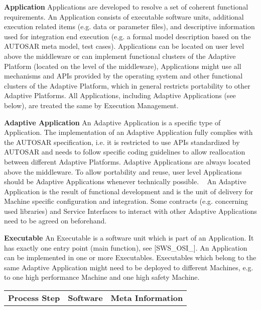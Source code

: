 \begin{DoxyItemize}
\item {\bfseries Application} Applications are developed to resolve a set of coherent functional requirements. An Application consists of executable software units, additional execution related items (e.\+g. data or parameter files), and descriptive information used for integration end execution (e.\+g. a formal model description based on the A\+U\+T\+O\+S\+AR meta model, test cases). Applications can be located on user level above the middleware or can implement functional clusters of the Adaptive Platform (located on the level of the middleware), Applications might use all mechanisms and A\+P\+Is provided by the operating system and other functional clusters of the Adaptive Platform, which in general restricts portability to other Adaptive Platforms. All Applications, including Adaptive Applications (see below), are treated the same by Execution Management.
\item {\bfseries Adaptive Application} An Adaptive Application is a specific type of Application. The implementation of an Adaptive Application fully complies with the A\+U\+T\+O\+S\+AR specification, i.\+e. it is restricted to use A\+P\+Is standardized by A\+U\+T\+O\+S\+AR and needs to follow specific coding guidelines to allow reallocation between different Adaptive Platforms. Adaptive Applications are always located above the middleware. To allow portability and reuse, user level Applications should be Adaptive Applications whenever technically possible. ~\newline
 An Adaptive Application is the result of functional development and is the unit of delivery for Machine specific configuration and integration. Some contracts (e.\+g. concerning used libraries) and Service Interfaces to interact with other Adaptive Applications need to be agreed on beforehand.
\item {\bfseries Executable} An Executable is a software unit which is part of an Application. It has exactly one entry point (main function), see \mbox{[}S\+W\+S\+\_\+\+O\+S\+I\+\_\mbox{]}. An Application can be implemented in one or more Executables. Executables which belong to the same Adaptive Application might need to be deployed to different Machines, e.\+g. to one high performance Machine and one high safety Machine. ~\newline
 \tabulinesep=1mm
\begin{longtabu} spread 0pt [c]{*{3}{|X[-1]}|}
\hline
\rowcolor{\tableheadbgcolor}\textbf{ Process Step  }&\textbf{ Software  }&\textbf{ Meta Information   }\\

\end{longtabu}
\end{DoxyItemize}
